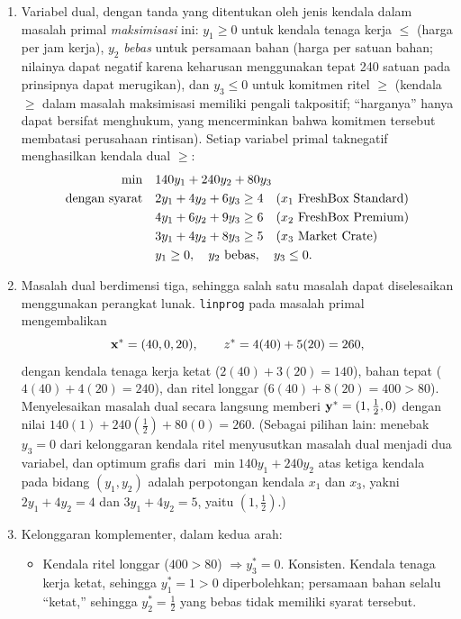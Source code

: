 \begin{enumerate}
\item Variabel dual, dengan tanda yang ditentukan oleh jenis kendala dalam masalah primal \emph{maksimisasi} ini: $y_1 \ge 0$ untuk kendala tenaga kerja $\leq$ (harga per jam kerja), $y_2$ \emph{bebas} untuk persamaan bahan (harga per satuan bahan; nilainya dapat negatif karena keharusan menggunakan tepat 240 satuan pada prinsipnya dapat merugikan), dan $y_3 \le 0$ untuk komitmen ritel $\geq$ (kendala $\geq$ dalam masalah maksimisasi memiliki pengali takpositif; ``harganya'' hanya dapat bersifat menghukum, yang mencerminkan bahwa komitmen tersebut membatasi perusahaan rintisan). Setiap variabel primal taknegatif menghasilkan kendala dual $\geq$:
\[
\begin{aligned}
\min \quad & 140y_1 + 240y_2 + 80y_3 \\
\mbox{dengan syarat}\quad & 2y_1 + 4y_2 + 6y_3 \ge 4 \quad (x_1 \mbox{ FreshBox Standard}) \\
& 4y_1 + 6y_2 + 9y_3 \ge 6 \quad (x_2 \mbox{ FreshBox Premium}) \\
& 3y_1 + 4y_2 + 8y_3 \ge 5 \quad (x_3 \mbox{ Market Crate}) \\
& y_1 \ge 0, \quad y_2 \mbox{ bebas}, \quad y_3 \le 0 .
\end{aligned}
\]
\item Masalah dual berdimensi tiga, sehingga salah satu masalah dapat diselesaikan menggunakan perangkat lunak. \texttt{linprog} pada masalah primal mengembalikan
\[
\mathbf{x}^* = (40, 0, 20), \qquad z^* = 4(40) + 5(20) = 260,
\]
dengan kendala tenaga kerja ketat ($2(40) + 3(20) = 140$), bahan tepat ($4(40) + 4(20) = 240$), dan ritel longgar ($6(40) + 8(20) = 400 > 80$). Menyelesaikan masalah dual secara langsung memberi $\mathbf{y}^* = (1, \tfrac12, 0)$ dengan nilai $140(1) + 240(\tfrac12) + 80(0) = 260$. (Sebagai pilihan lain: menebak $y_3 = 0$ dari kelonggaran kendala ritel menyusutkan masalah dual menjadi dua variabel, dan optimum grafis dari $\min 140y_1 + 240y_2$ atas ketiga kendala pada bidang $(y_1, y_2)$ adalah perpotongan kendala $x_1$ dan $x_3$, yakni $2y_1 + 4y_2 = 4$ dan $3y_1 + 4y_2 = 5$, yaitu $(1, \tfrac12)$.)
\item Kelonggaran komplementer, dalam kedua arah:
\begin{itemize}
\item Kendala ritel longgar ($400 > 80$) $\Rightarrow y_3^* = 0$. Konsisten. Kendala tenaga kerja ketat, sehingga $y_1^* = 1 > 0$ diperbolehkan; persamaan bahan selalu ``ketat,'' sehingga $y_2^* = \tfrac12$ yang bebas tidak memiliki syarat tersebut.

\end{itemize}
\end{enumerate}
